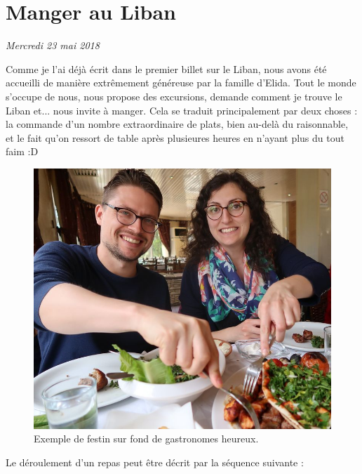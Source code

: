 \hypertarget{manger-au-liban}{%
\section{Manger au Liban}\label{manger-au-liban}}

\emph{Mercredi 23 mai 2018}

Comme je l'ai déjà écrit dans le premier billet sur le Liban, nous avons
été accueilli de manière extrêmement généreuse par la famille d'Elida.
Tout le monde s'occupe de nous, nous propose des excursions, demande
comment je trouve le Liban et... nous invite à manger. Cela se traduit
principalement par deux choses : la commande d'un nombre extraordinaire
de plats, bien au-delà du raisonnable, et le fait qu'on ressort de table
après plusieures heures en n'ayant plus du tout faim :D

\begin{figure}
\centering
\includegraphics{images/20180523_manger.JPG}
\caption{Exemple de festin sur fond de gastronomes heureux.}
\end{figure}

Le déroulement d'un repas peut être décrit par la séquence suivante :

